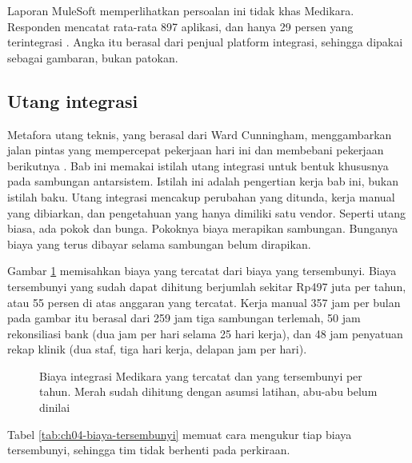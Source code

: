 Laporan MuleSoft memperlihatkan persoalan ini tidak khas Medikara. Responden mencatat rata-rata 897
aplikasi, dan hanya 29 persen yang terintegrasi \cite{c04-mulesoft2025}. Angka itu berasal dari penjual
platform integrasi, sehingga dipakai sebagai gambaran, bukan patokan.

\subsection*{Utang integrasi}

Metafora utang teknis, yang berasal dari Ward Cunningham, menggambarkan jalan pintas yang mempercepat
pekerjaan hari ini dan membebani pekerjaan berikutnya \cite{c04-kruchten2012debt}. Bab ini memakai istilah
utang integrasi untuk bentuk khususnya pada sambungan antarsistem. Istilah ini adalah pengertian kerja bab
ini, bukan istilah baku. Utang integrasi mencakup perubahan yang ditunda, kerja manual yang dibiarkan, dan
pengetahuan yang hanya dimiliki satu vendor. Seperti utang biasa, ada pokok dan bunga. Pokoknya biaya
merapikan sambungan. Bunganya biaya yang terus dibayar selama sambungan belum dirapikan.

Gambar \ref{fig:ch04-utang-integrasi} memisahkan biaya yang tercatat dari biaya yang tersembunyi. Biaya
tersembunyi yang sudah dapat dihitung berjumlah sekitar Rp497 juta per tahun, atau 55 persen di atas
anggaran yang tercatat. Kerja manual 357 jam per bulan pada gambar itu berasal dari 259 jam tiga sambungan
terlemah, 50 jam rekonsiliasi bank (dua jam per hari selama 25 hari kerja), dan 48 jam penyatuan rekap klinik
(dua staf, tiga hari kerja, delapan jam per hari).

\begin{figure}[!htb]
  \centering
  
  \caption{Biaya integrasi Medikara yang tercatat dan yang tersembunyi per tahun. Merah sudah dihitung
           dengan asumsi latihan, abu-abu belum dinilai}
  \label{fig:ch04-utang-integrasi}
\end{figure}

Tabel \ref{tab:ch04-biaya-tersembunyi} memuat cara mengukur tiap biaya tersembunyi, sehingga tim tidak
berhenti pada perkiraan.

